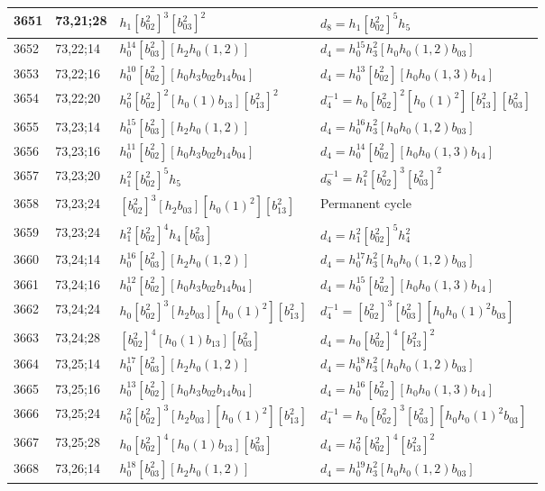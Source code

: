 \documentclass{article}
\begin{document}
\begin{longtable}{|l|l|>{\raggedright\arraybackslash}p{6cm}|>{\raggedright\arraybackslash}p{6cm}|}
\hline
3651 & 73,21;28 & $h_1[b_{02}^2]^3[b_{03}^2]^2$ &$d_{8}=h_1[b_{02}^2]^5h_5$\\
\hline
3652 & 73,22;14 & $h_0^{14}[b_{03}^2][h_2h_0(1, 2)]$ &$d_{4}=h_0^{15}h_3^2[h_0h_0(1, 2)b_{03}]$\\
\hline
3653 & 73,22;16 & $h_0^{10}[b_{02}^2][h_0h_3b_{02}b_{14}b_{04}]$ &$d_{4}=h_0^{13}[b_{02}^2][h_0h_0(1, 3)b_{14}]$\\
\hline
3654 & 73,22;20 & $h_0^2[b_{02}^2]^2[h_0(1)b_{13}][b_{13}^2]^2$ & $d_{4}^{-1}=h_0[b_{02}^2]^2[h_0(1)^2][b_{13}^2][b_{03}^2]$\\
\hline
3655 & 73,23;14 & $h_0^{15}[b_{03}^2][h_2h_0(1, 2)]$ &$d_{4}=h_0^{16}h_3^2[h_0h_0(1, 2)b_{03}]$\\
\hline
3656 & 73,23;16 & $h_0^{11}[b_{02}^2][h_0h_3b_{02}b_{14}b_{04}]$ &$d_{4}=h_0^{14}[b_{02}^2][h_0h_0(1, 3)b_{14}]$\\
\hline
3657 & 73,23;20 & $h_1^2[b_{02}^2]^5h_5$ & $d_{8}^{-1}=h_1^2[b_{02}^2]^3[b_{03}^2]^2$\\
\hline
3658 & 73,23;24 & $[b_{02}^2]^3[h_2b_{03}][h_0(1)^2][b_{13}^2]$ & Permanent cycle\\
3659 & 73,23;24 & $h_1^2[b_{02}^2]^4h_4[b_{03}^2]$ &$d_{4}=h_1^2[b_{02}^2]^5h_4^2$\\
\hline
3660 & 73,24;14 & $h_0^{16}[b_{03}^2][h_2h_0(1, 2)]$ &$d_{4}=h_0^{17}h_3^2[h_0h_0(1, 2)b_{03}]$\\
\hline
3661 & 73,24;16 & $h_0^{12}[b_{02}^2][h_0h_3b_{02}b_{14}b_{04}]$ &$d_{4}=h_0^{15}[b_{02}^2][h_0h_0(1, 3)b_{14}]$\\
\hline
3662 & 73,24;24 & $h_0[b_{02}^2]^3[h_2b_{03}][h_0(1)^2][b_{13}^2]$ & $d_{4}^{-1}=[b_{02}^2]^3[b_{03}^2][h_0h_0(1)^2b_{03}]$\\
\hline
3663 & 73,24;28 & $[b_{02}^2]^4[h_0(1)b_{13}][b_{03}^2]$ &$d_{4}=h_0[b_{02}^2]^4[b_{13}^2]^2$\\
\hline
3664 & 73,25;14 & $h_0^{17}[b_{03}^2][h_2h_0(1, 2)]$ &$d_{4}=h_0^{18}h_3^2[h_0h_0(1, 2)b_{03}]$\\
\hline
3665 & 73,25;16 & $h_0^{13}[b_{02}^2][h_0h_3b_{02}b_{14}b_{04}]$ &$d_{4}=h_0^{16}[b_{02}^2][h_0h_0(1, 3)b_{14}]$\\
\hline
3666 & 73,25;24 & $h_0^2[b_{02}^2]^3[h_2b_{03}][h_0(1)^2][b_{13}^2]$ & $d_{4}^{-1}=h_0[b_{02}^2]^3[b_{03}^2][h_0h_0(1)^2b_{03}]$\\
\hline
3667 & 73,25;28 & $h_0[b_{02}^2]^4[h_0(1)b_{13}][b_{03}^2]$ &$d_{4}=h_0^2[b_{02}^2]^4[b_{13}^2]^2$\\
\hline
3668 & 73,26;14 & $h_0^{18}[b_{03}^2][h_2h_0(1, 2)]$ &$d_{4}=h_0^{19}h_3^2[h_0h_0(1, 2)b_{03}]$\\

\end{longtable}
\end{document}
